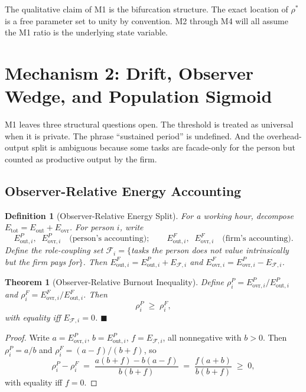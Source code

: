 \documentclass[11pt]{article}
\newtheorem{theorem}{Theorem}
\newtheorem{definition}{Definition}
\begin{document}
\noindent The qualitative claim of M1 is the bifurcation structure. The exact
location of $\rho^*$ is a free parameter set to unity by convention. M2
through M4 will all assume the M1 ratio is the underlying state variable.

\section{Mechanism 2: Drift, Observer Wedge, and Population Sigmoid}
\label{sec:m2}

M1 leaves three structural questions open. The threshold is treated as
universal when it is private. The phrase ``sustained period'' is undefined.
And the overhead-output split is ambiguous because some tasks are
facade-only for the person but counted as productive output by the firm.

\subsection{Observer-Relative Energy Accounting}

\begin{definition}[Observer-Relative Energy Split]
For a working hour, decompose $E_{\text{tot}} = E_{\text{out}} + E_{\text{ovr}}$.
For person $i$, write
\[
E_{\text{out},i}^{P}, \;\; E_{\text{ovr},i}^{P} \quad \text{(person's accounting)};
\qquad
E_{\text{out},i}^{F}, \;\; E_{\text{ovr},i}^{F} \quad \text{(firm's accounting)}.
\]
Define the role-coupling set $\mathcal{F}_i = \{$tasks the person does not
value intrinsically but the firm pays for$\}$. Then $E_{\text{out},i}^{F} =
E_{\text{out},i}^{P} + E_{\mathcal{F},i}$ and $E_{\text{ovr},i}^{F} =
E_{\text{ovr},i}^{P} - E_{\mathcal{F},i}$.
\end{definition}

\begin{theorem}[Observer-Relative Burnout Inequality]
\label{thm:wedge}
Define $\rho_i^{P} = E_{\text{ovr},i}^{P}/E_{\text{out},i}^{P}$ and
$\rho_i^{F} = E_{\text{ovr},i}^{F}/E_{\text{out},i}^{F}$. Then
\[
\rho_i^{P} \;\geq\; \rho_i^{F},
\]
with equality iff $E_{\mathcal{F},i} = 0$. \hfill$\blacksquare$
\end{theorem}

\begin{proof}
Write $a = E_{\text{ovr},i}^{P}$, $b = E_{\text{out},i}^{P}$,
$f = E_{\mathcal{F},i}$, all nonnegative with $b > 0$. Then $\rho_i^{P} = a/b$
and $\rho_i^{F} = (a-f)/(b+f)$, so
\[
\rho_i^{P} - \rho_i^{F} \;=\; \frac{a(b+f) - b(a-f)}{b(b+f)} \;=\; \frac{f(a+b)}{b(b+f)} \;\geq\; 0,
\]
with equality iff $f = 0$.
\end{proof}
\end{document}
